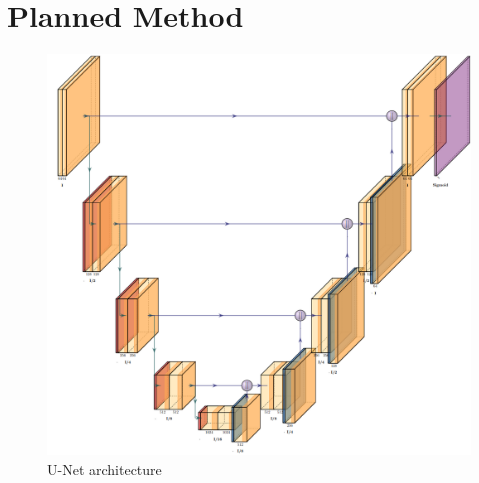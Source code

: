 \documentclass[12pt]{extarticle}
\begin{document}
\section{Planned Method}
\begin{figure}[ht!]
\centering
\includegraphics[scale=0.28]{fig2.png}
\caption{U-Net architecture\cite{iqbal_2018}}
\label{pre_results}
\end{figure}
\end{document}
